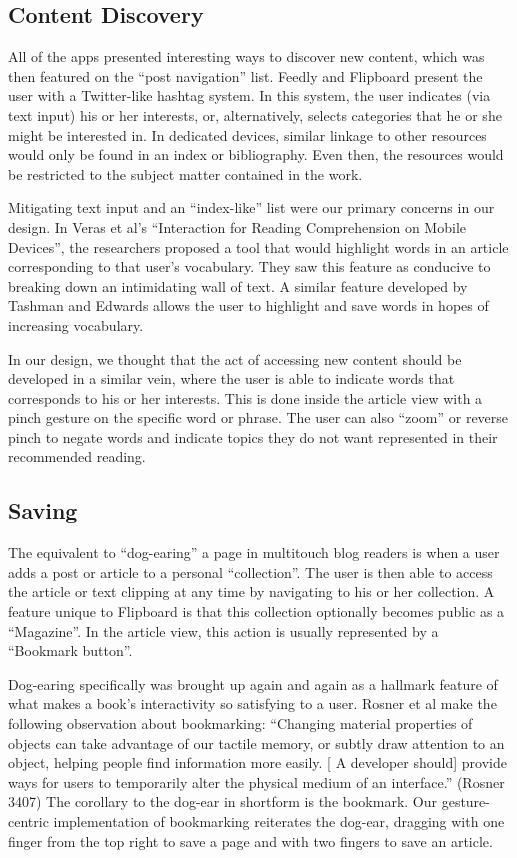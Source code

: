 \documentclass[11pt, oneside]{article}   	%
\begin{document}
\subsection{Content Discovery}
All of the apps presented interesting ways to discover new content, which was then featured on the ``post navigation'' list. Feedly and Flipboard present the user with a Twitter-like hashtag system. In this system, the user indicates (via text input) his or her interests, or, alternatively, selects categories that he or she might be interested in. In dedicated devices, similar linkage to other resources would only be found in an index or bibliography. Even then, the resources would be restricted to the subject matter contained in the work.

Mitigating text input and an ``index-like'' list were our primary concerns in our design. In Veras et al's ``Interaction for Reading Comprehension on Mobile Devices'', the researchers proposed a tool that would highlight words in an article corresponding to that user's vocabulary. They saw this feature as conducive to breaking down an intimidating wall of text. A similar feature developed by Tashman and Edwards allows the user to highlight and save words in hopes of increasing vocabulary.

In our design, we thought that the act of accessing new content  should be developed in a similar vein, where the user is able to indicate words that corresponds to his or her interests. This is done inside the article view with a pinch gesture on the specific word or phrase. The user can also ``zoom'' or reverse pinch to negate words and indicate topics they do not want represented in their recommended reading.

\subsection{Saving}
The equivalent to ``dog-earing'' a page in multitouch blog readers is when a user adds a post or article to a personal ``collection''. The user is then able to access the article or text clipping at any time by navigating to his or her collection. A feature unique to Flipboard is that this collection optionally becomes public as a ``Magazine''. In the article view, this action is usually represented by a ``Bookmark button''.

Dog-earing specifically was brought up again and again as a hallmark feature of what makes a book's interactivity so satisfying to a user. Rosner et al make the following observation about bookmarking: ``Changing material properties of objects can take advantage of our tactile memory, or subtly draw attention to an object, helping people find information more easily. [ A developer should] provide ways for users to temporarily alter the physical medium of an interface.'' (Rosner 3407) The corollary to the dog-ear in shortform is the bookmark. Our gesture-centric implementation of bookmarking reiterates the dog-ear, dragging with one finger from the top right to save a page and with two fingers to save an article.
\end{document}

